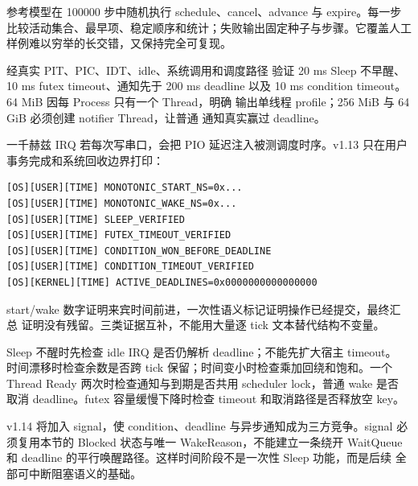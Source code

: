 参考模型在 100000 步中随机执行 schedule、cancel、advance 与 expire。每一步
比较活动集合、最早项、稳定顺序和统计；失败输出固定种子与步骤。它覆盖人工
样例难以穷举的长交错，又保持完全可复现。

 经真实 PIT、PIC、IDT、idle、系统调用和调度路径
验证 20 ms Sleep 不早醒、10 ms futex timeout、通知先于 200 ms deadline
以及 10 ms condition timeout。64 MiB 因每 Process 只有一个 Thread，明确
输出单线程 profile；256 MiB 与 64 GiB 必须创建 notifier Thread，让普通
通知真实赢过 deadline。

一千赫兹 IRQ 若每次写串口，会把 PIO 延迟注入被测调度时序。v1.13 只在用户
事务完成和系统回收边界打印：

\begin{lstlisting}
[OS][USER][TIME] MONOTONIC_START_NS=0x...
[OS][USER][TIME] MONOTONIC_WAKE_NS=0x...
[OS][USER][TIME] SLEEP_VERIFIED
[OS][USER][TIME] FUTEX_TIMEOUT_VERIFIED
[OS][USER][TIME] CONDITION_WON_BEFORE_DEADLINE
[OS][USER][TIME] CONDITION_TIMEOUT_VERIFIED
[OS][KERNEL][TIME] ACTIVE_DEADLINES=0x0000000000000000
\end{lstlisting}

start/wake 数字证明来宾时间前进，一次性语义标记证明操作已经提交，最终汇总
证明没有残留。三类证据互补，不能用大量逐 tick 文本替代结构不变量。

Sleep 不醒时先检查 idle IRQ 是否仍解析 deadline；不能先扩大宿主 timeout。
时间漂移时检查余数是否跨 tick 保留；时间变小时检查乘加回绕和饱和。一个
Thread Ready 两次时检查通知与到期是否共用 scheduler lock，普通 wake 是否
取消 deadline。futex 容量缓慢下降时检查 timeout 和取消路径是否释放空 key。

v1.14 将加入 signal，使 condition、deadline 与异步通知成为三方竞争。signal
必须复用本节的 Blocked 状态与唯一 WakeReason，不能建立一条绕开 WaitQueue
和 deadline 的平行唤醒路径。这样时间阶段不是一次性 Sleep 功能，而是后续
全部可中断阻塞语义的基础。
